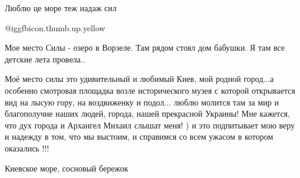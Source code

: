 \begin{itemize}
Люблю це море теж надаж сил

 @igg{fbicon.thumb.up.yellow} 

Мое место Силы - озеро в Ворзеле. Там рядом стоял дом бабушки. Я там все детские лета провела..


Моё место силы это удивительный и любимый Киев, мой родной город...а особенно
смотровая площадка возле исторического музея с которой открывается вид на лысую
гору, на воздвиженку и подол... люблю молится там за мир и благополучие наших
людей, города, нашей прекрасной Украины! Мне кажется, что дух города и
Архангел Михаил слышат меня! ) и это подпитывает мою веру и надежду в том, что
мы выстоим, и справимся со всем ужасом в котором оказались !!!

Киевское море, сосновый бережок

\end{itemize} %
